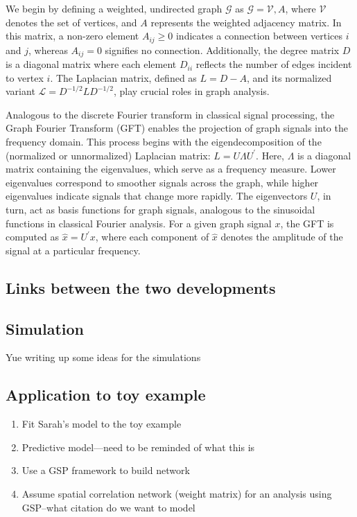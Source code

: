\documentclass[12pt]{article}
\begin{document}
We begin by defining a weighted, undirected graph $\mathcal{G}$ as $\mathcal{G} = {\mathcal{V}, A}$, where $\mathcal{V}$ denotes the set of vertices, and $A$ represents the weighted adjacency matrix. In this matrix, a non-zero element $A_{ij} \geq 0$ indicates a connection between vertices $i$ and $j$, whereas $A_{ij} = 0$ signifies no connection. Additionally, the degree matrix $D$ is a diagonal matrix where each element $D_{ii}$ reflects the number of edges incident to vertex $i$. The Laplacian matrix, defined as $L = D - A$, and its normalized variant $\mathcal{L} = D^{-1/2}LD^{-1/2}$, play crucial roles in graph analysis.

Analogous to the discrete Fourier transform in classical signal processing, the Graph Fourier Transform (GFT) enables the projection of graph signals into the frequency domain. This process begins with the eigendecomposition of the (normalized or unnormalized) Laplacian matrix: $L = U\Lambda U^{\prime}$. Here, $\Lambda$ is a diagonal matrix containing the eigenvalues, which serve as a frequency measure. Lower eigenvalues correspond to smoother signals across the graph, while higher eigenvalues indicate signals that change more rapidly. The eigenvectors $U$, in turn, act as basis functions for graph signals, analogous to the sinusoidal functions in classical Fourier analysis. For a given graph signal $x$, the GFT is computed as $\hat{x} = U^{\prime} x$, where each component of $\hat{x}$ denotes the amplitude of the signal at a particular frequency.

\subsection{Links between the two developments}

\subsection{Simulation}
Yue writing up some ideas for the simulations

\subsection{Application to toy example}
\begin{enumerate}
	\item{Fit Sarah's model to the toy example}
	\item{Predictive model---need to be reminded of what this is}
	\item{Use a GSP framework to build network}
	\item{Assume spatial correlation network (weight matrix) for an analysis using GSP--what citation do we want to model}
\end{enumerate}
\end{document}
